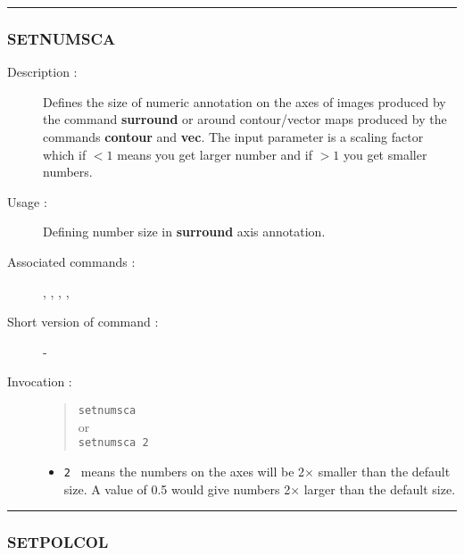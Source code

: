 \hrule 
\subsubsection*{\label{SETNUMSCA}SETNUMSCA}

\begin{description}

\item[Description :] Defines the size of numeric annotation on the axes
of images produced by the command {\bf surround} or around
contour/vector maps produced by the commands {\bf contour} and {\bf
vec}.  The input parameter is a scaling factor which if $<1$ means you
get larger number and if $>1$ you get smaller numbers.

\item[Usage :] Defining number size in {\bf surround} axis annotation.

\item[Associated commands :] {\tt {}}, 
{\tt {}}, {\tt {}}, 
{\tt {}}, {\tt {}}

\item[Short version of command :] -
\item[Invocation :]

\begin{quote}{\tt  setnumsca }\\
or \\
{\tt setnumsca 2 }
\end{quote}

\begin{itemize}

\item {\tt 2 } means the numbers on the axes will be 2$\times$ smaller
than the default size. A value of 0.5 would give numbers 2$\times$
larger than the default size.

\end{itemize}

\end{description}

\hrule 
\subsubsection*{\label{SETPOLCOL}SETPOLCOL}

